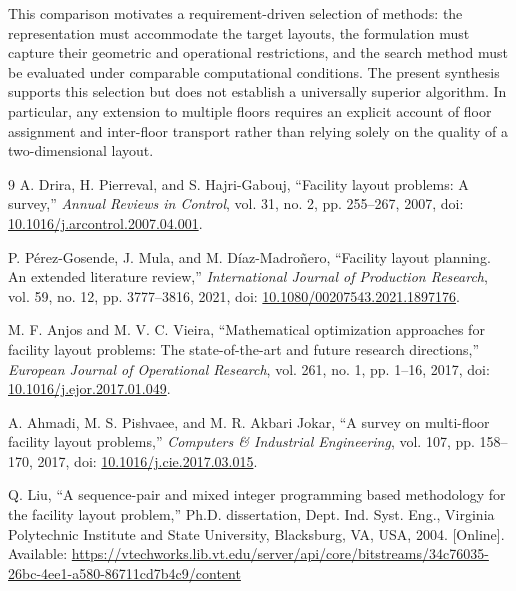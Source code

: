 \documentclass[10pt,a4paper]{article}
\begin{document}
This comparison motivates a requirement-driven selection of methods: the
representation must accommodate the target layouts, the formulation must
capture their geometric and operational restrictions, and the search method
must be evaluated under comparable computational conditions. The present
synthesis supports this selection but does not establish a universally superior
algorithm. In particular, any extension to multiple floors requires an explicit
account of floor assignment and inter-floor transport rather than relying solely
on the quality of a two-dimensional layout.

\begin{thebibliography}{9}
A. Drira, H. Pierreval, and S. Hajri-Gabouj,
``Facility layout problems: A survey,''
\textit{Annual Reviews in Control}, vol. 31, no. 2, pp. 255--267, 2007,
doi: \href{https://doi.org/10.1016/j.arcontrol.2007.04.001}{10.1016/j.arcontrol.2007.04.001}.

P. P\'{e}rez-Gosende, J. Mula, and M. D\'{i}az-Madro\~nero,
``Facility layout planning. An extended literature review,''
\textit{International Journal of Production Research}, vol. 59, no. 12,
pp. 3777--3816, 2021,
doi: \href{https://doi.org/10.1080/00207543.2021.1897176}{10.1080/00207543.2021.1897176}.

M. F. Anjos and M. V. C. Vieira,
``Mathematical optimization approaches for facility layout problems:
The state-of-the-art and future research directions,''
\textit{European Journal of Operational Research}, vol. 261, no. 1,
pp. 1--16, 2017,
doi: \href{https://doi.org/10.1016/j.ejor.2017.01.049}{10.1016/j.ejor.2017.01.049}.

A. Ahmadi, M. S. Pishvaee, and M. R. Akbari Jokar,
``A survey on multi-floor facility layout problems,''
\textit{Computers \& Industrial Engineering}, vol. 107, pp. 158--170, 2017,
doi: \href{https://doi.org/10.1016/j.cie.2017.03.015}{10.1016/j.cie.2017.03.015}.

Q. Liu, ``A sequence-pair and mixed integer programming based methodology
for the facility layout problem,'' Ph.D. dissertation, Dept. Ind. Syst. Eng.,
Virginia Polytechnic Institute and State University, Blacksburg, VA, USA, 2004.
[Online]. Available:
\url{https://vtechworks.lib.vt.edu/server/api/core/bitstreams/34c76035-26bc-4ee1-a580-86711cd7b4c9/content}
\end{thebibliography}
\end{document}
